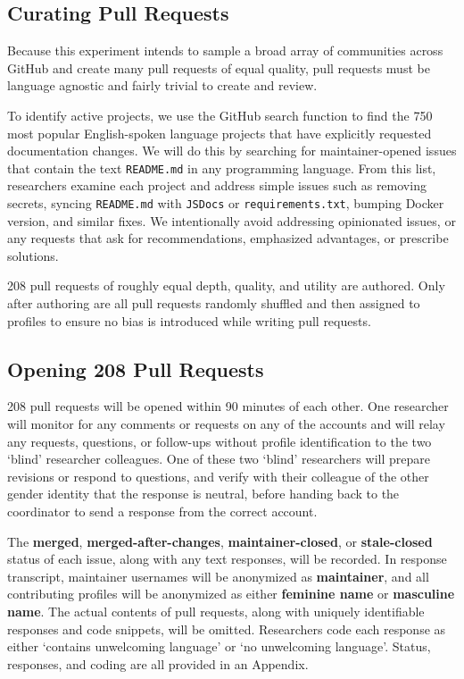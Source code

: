\documentclass[journal,12pt,onecolumn,]{IEEEtran}
\begin{document}
\subsection{Curating Pull Requests} %

Because this experiment intends to sample a broad array of communities across GitHub and create many pull requests of equal quality, pull requests must be language agnostic and fairly trivial to create and review.

To identify active projects, we use the GitHub search function to find the 750 most popular English-spoken language projects that have explicitly requested documentation changes. 
We will do this by searching for maintainer-opened issues that contain the text \texttt{README.md} in any programming language. 
From this list, researchers examine each project and address simple issues such as removing secrets, syncing \texttt{README.md}  with \texttt{JSDocs} or \texttt{requirements.txt}, 
bumping Docker version, and similar fixes. We intentionally avoid addressing opinionated issues, or any requests that ask for recommendations, emphasized advantages, or prescribe solutions.

208 pull requests of roughly equal depth, quality, and utility are authored. 
Only after authoring are all pull requests randomly shuffled and then assigned to profiles to ensure no bias is introduced while writing pull requests.

\subsection{Opening 208 Pull Requests}

208 pull requests will be opened within 90 minutes of each other.
One researcher will monitor for any comments or requests on any of the accounts and will relay any requests, questions, or follow-ups without profile identification to the two `blind' researcher colleagues.
One of these two `blind' researchers will prepare revisions or respond to questions, and verify with their colleague of the other gender identity that the response is neutral, before handing back to the coordinator to send a response from the correct account.

The \textbf{merged}, \textbf{merged-after-changes}, \textbf{maintainer-closed}, or \textbf{stale-closed} status of each issue, along with any text responses, will be recorded.
In response transcript, maintainer usernames will be anonymized as \textbf{maintainer}, and all contributing profiles will be anonymized as either \textbf{feminine name} or \textbf{masculine name}.
The actual contents of pull requests, along with uniquely identifiable responses and code snippets, will be omitted.
Researchers code each response as either `contains unwelcoming language' or `no unwelcoming language'.
Status, responses, and coding are all provided in an Appendix.
\end{document}
